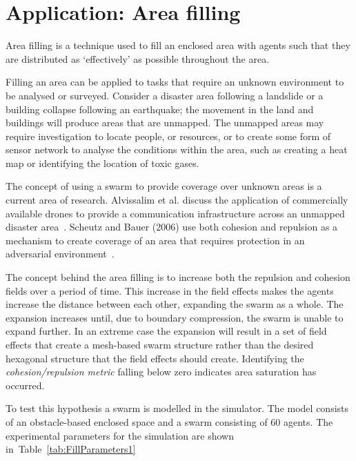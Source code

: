 \documentclass{ieeeaccess}
\begin{document}
\section{Application: Area filling}\label{Section:ApplicationFloodFilling}

Area filling is a technique used to fill an enclosed area with agents such that
they are distributed as `effectively' as possible throughout the area. 

Filling an area can be applied to tasks that require an unknown environment to
be analysed or surveyed. Consider a disaster area following a landslide or a
building collapse following an earthquake; the movement in the land and
buildings will produce areas that are unmapped. The unmapped areas may require
investigation to locate people, or resources, or to create some form of sensor
network to analyse the conditions within the area, such as creating a heat map
or identifying the location of toxic gases. 

The concept of using a swarm to provide coverage over unknown areas is a
current area of research. Alvissalim et al. discuss the application of
commercially available drones to provide a communication infrastructure across
an unmapped disaster area~\cite{AZHMJJM:12}. Scheutz and Bauer (2006) use both
cohesion and repulsion as a mechanism to create coverage of an area that
requires protection in an adversarial environment~\cite{SB:06}.

The concept behind the area filling is to increase both the repulsion and
cohesion fields over a period of time. This increase in the field effects makes
the agents increase the distance between each other, expanding the swarm as a
whole. The expansion increases until, due to boundary compression, the swarm is
unable to expand further. In an extreme case the expansion will result in a set
of field effects that create a mesh-based swarm structure rather than the
desired hexagonal structure that the field effects should create. Identifying
the \textit{cohesion/repulsion metric} falling below zero indicates area
saturation has occurred.

To test this hypothesis a swarm is modelled in the simulator. The model
consists of an obstacle-based enclosed space and a swarm consisting of 60
agents. The experimental parameters for the simulation are shown
in~Table~\ref{tab:FillParameters1}
\end{document}
